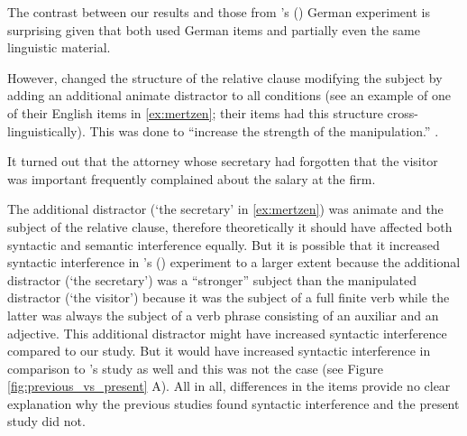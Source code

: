 \documentclass[review,preprint,12pt,authoryear,floatsintext]{elsarticle}
\begin{document}
{{The contrast between our results and those from  \citeauthor{mertzen}'s (\citeyear{mertzen}) German experiment is surprising given that both used German items and partially even the same linguistic material. {However, \citet{mertzen} changed the structure of the relative clause modifying the subject by adding an additional animate distractor to all conditions (see an example of one of their English items in \ref{ex:mertzen}; their items had this structure cross-linguistically). This was done to ``increase the strength of the manipulation.'' \citep[][p. 9]{mertzen}. 

\begin{exe}[ht]
\ex \label{ex:mertzen} 
It turned out that the attorney whose secretary had forgotten that the visitor was important frequently complained about the salary at the firm. \citep{mertzen}
\end{exe}
}

The additional distractor (`the secretary' in \ref{ex:mertzen}) was animate and the subject of the relative clause, therefore theoretically it should have affected both syntactic and semantic interference equally. But it is possible that it increased syntactic interference in \citeauthor{mertzen}'s (\citeyear{mertzen}) experiment to a larger extent because the additional distractor (`the secretary') was a ``stronger'' subject than the manipulated distractor (`the visitor') because it was the subject of a full finite verb while the latter was always the subject of a verb phrase consisting of an auxiliar and an adjective. This additional distractor might have increased syntactic interference compared to our study. But it would have increased syntactic interference in comparison to \citeauthor{vandyke07}'s study as well and this was not the case (see Figure \ref{fig:previous_vs_present} A).\label{items_mertzen} All in all, differences in the items provide no clear explanation why the previous studies found syntactic interference and the present study did not.

}}
\end{document}
